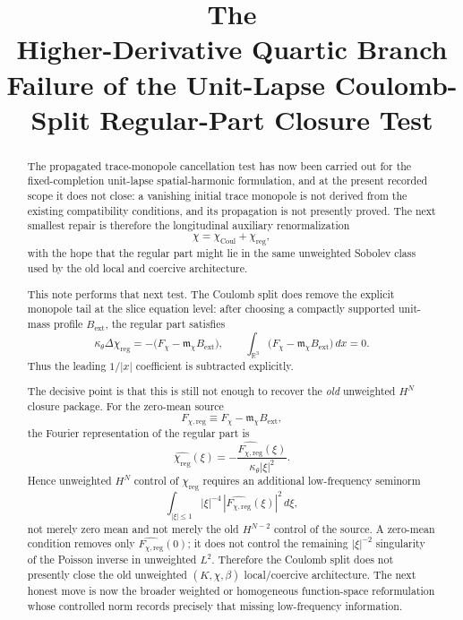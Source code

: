 \documentclass[11pt]{article}
\title{\textbf{The \TheoryName{}}\\[0.4em]
\large Higher-Derivative Quartic Branch Failure of the Unit-Lapse Coulomb-Split Regular-Part Closure Test}
\author{}
\date{}
\begin{document}
\maketitle

\begin{abstract}
The propagated trace-monopole cancellation test has now been carried out for the fixed-completion unit-lapse spatial-harmonic formulation, and at the present recorded scope it does not close: a vanishing initial trace monopole is not derived from the existing compatibility conditions, and its propagation is not presently proved. The next smallest repair is therefore the longitudinal auxiliary renormalization
\[
\chi=\chi_{\mathrm{Coul}}+\chi_{\mathrm{reg}},
\]
with the hope that the regular part might lie in the same unweighted Sobolev class used by the old local and coercive architecture.

This note performs that next test. The Coulomb split does remove the explicit monopole tail at the slice equation level: after choosing a compactly supported unit-mass profile \(B_{\mathrm{ext}}\), the regular part satisfies
\[
\kappa_\theta \Delta \chi_{\mathrm{reg}}
=
-\bigl(F_\chi-\mathfrak m_\chi B_{\mathrm{ext}}\bigr),
\qquad
\int_{\mathbb R^3}\bigl(F_\chi-\mathfrak m_\chi B_{\mathrm{ext}}\bigr)\,dx=0.
\]
Thus the leading \(1/|x|\) coefficient is subtracted explicitly.

The decisive point is that this is still not enough to recover the \emph{old} unweighted \(H^N\) closure package. For the zero-mean source
\[
F_{\chi,\mathrm{reg}}
\equiv
F_\chi-\mathfrak m_\chi B_{\mathrm{ext}},
\]
the Fourier representation of the regular part is
\[
\widehat{\chi_{\mathrm{reg}}}(\xi)
=
-\frac{\widehat{F_{\chi,\mathrm{reg}}}(\xi)}{\kappa_\theta |\xi|^2}.
\]
Hence unweighted \(H^N\) control of \(\chi_{\mathrm{reg}}\) requires an additional low-frequency seminorm
\[
\int_{|\xi|\le 1} |\xi|^{-4}\,|\widehat{F_{\chi,\mathrm{reg}}}(\xi)|^2\,d\xi,
\]
not merely zero mean and not merely the old \(H^{N-2}\) control of the source. A zero-mean condition removes only \(\widehat{F_{\chi,\mathrm{reg}}}(0)\); it does not control the remaining \(|\xi|^{-2}\) singularity of the Poisson inverse in unweighted \(L^2\). Therefore the Coulomb split does not presently close the old unweighted \((K,\chi,\beta)\) local/coercive architecture. The next honest move is now the broader weighted or homogeneous function-space reformulation whose controlled norm records precisely that missing low-frequency information.
\end{abstract}
\end{document}
